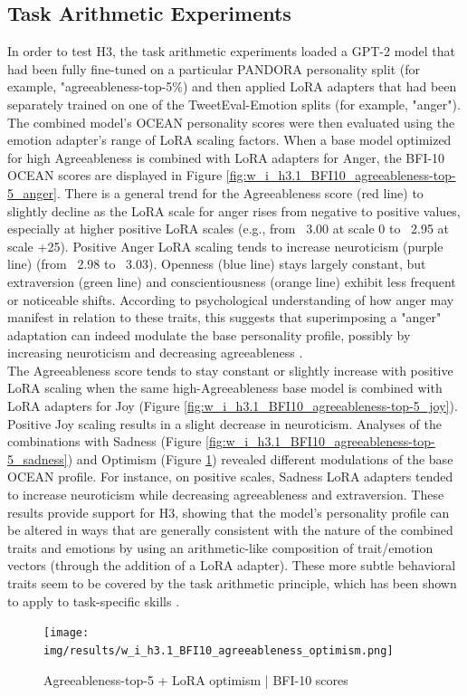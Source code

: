 \documentclass{DESSThesis}
\begin{document}
\subsection{Task Arithmetic Experiments}
In order to test H3, the task arithmetic experiments loaded a GPT-2 model that had been fully fine-tuned on a particular PANDORA personality split (for example, "agreeableness-top-5\%) and then applied LoRA adapters that had been separately trained on one of the TweetEval-Emotion splits (for example, "anger"). The combined model's OCEAN personality scores were then evaluated using the emotion adapter's range of LoRA scaling factors.
When a base model optimized for high Agreeableness is combined with LoRA adapters for Anger, the BFI-10 OCEAN scores are displayed in Figure \ref{fig:w_i_h3.1_BFI10_agreeableness-top-5_anger}. There is a general trend for the Agreeableness score (red line) to slightly decline as the LoRA scale for anger rises from negative to positive values, especially at higher positive LoRA scales (e.g., from ~3.00 at scale 0 to ~2.95 at scale +25). Positive Anger LoRA scaling tends to increase neuroticism (purple line) (from ~2.98 to ~3.03). Openness (blue line) stays largely constant, but extraversion (green line) and conscientiousness (orange line) exhibit less frequent or noticeable shifts. According to psychological understanding of how anger may manifest in relation to these traits, this suggests that superimposing a "anger" adaptation can indeed modulate the base personality profile, possibly by increasing neuroticism and decreasing agreeableness \cite{oshio_resilience_2018}.
\\
The Agreeableness score tends to stay constant or slightly increase with positive LoRA scaling when the same high-Agreeableness base model is combined with LoRA adapters for Joy (Figure \ref{fig:w_i_h3.1_BFI10_agreeableness-top-5_joy}). Positive Joy scaling results in a slight decrease in neuroticism. Analyses of the combinations with Sadness (Figure \ref{fig:w_i_h3.1_BFI10_agreeableness-top-5_sadness}) and Optimism (Figure \ref{fig:w_i_h3.1_BFI10_agreeableness-top-5_optimism}) revealed different modulations of the base OCEAN profile. For instance, on positive scales, Sadness LoRA adapters tended to increase neuroticism while decreasing agreeableness and extraversion. These results provide support for H3, showing that the model's personality profile can be altered in ways that are generally consistent with the nature of the combined traits and emotions by using an arithmetic-like composition of trait/emotion vectors (through the addition of a LoRA adapter). These more subtle behavioral traits seem to be covered by the task arithmetic principle, which has been shown to apply to task-specific skills \cite{ilharco_editing_2023, chronopoulou_language_2023}.
\\
\begin{figure}[H]
    \centering
    \texttt{[image: img/results/w\_i\_h3.1\_BFI10\_agreeableness\_optimism.png]}
    \caption{Agreeableness-top-5 + LoRA optimism | BFI-10 scores}
    \label{fig:w_i_h3.1_BFI10_agreeableness-top-5_optimism}
\end{figure}
\end{document}
